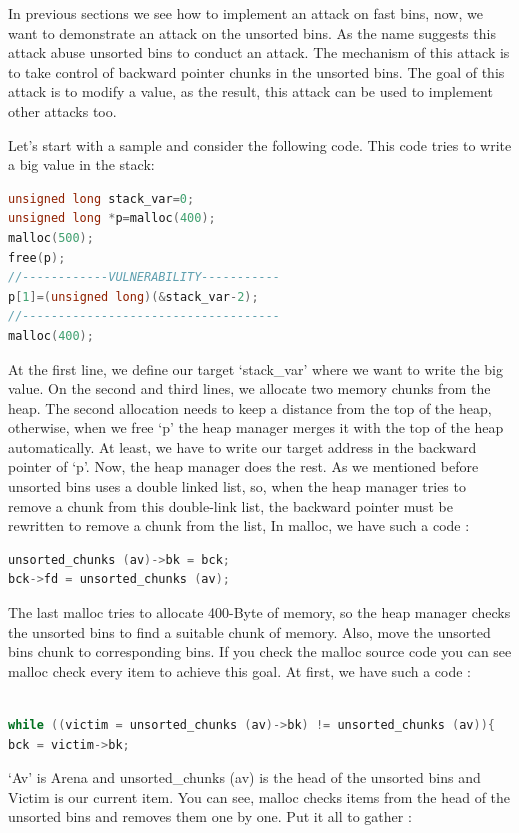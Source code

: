 \documentclass{masterthesis}
\newcommand*\fb{fast bins}
\newcommand*\ub{unsorted bins}
\begin{document}
In previous sections we see how to implement an attack on \fb{}, now, we want to demonstrate an attack on the \ub{}. As the name suggests this attack abuse \ub{} to conduct an attack. The mechanism of this attack is to take control of backward pointer chunks in the \ub{}. The goal of this attack is to modify a value, as the result, this attack can be used to implement other attacks too.

Let’s start with a sample and consider the following code. This code tries to write a big value in the stack:

\begin{lstlisting}[language=c,frame=tlrb]
unsigned long stack_var=0;
unsigned long *p=malloc(400);
malloc(500);
free(p);
//------------VULNERABILITY-----------
p[1]=(unsigned long)(&stack_var-2);
//------------------------------------
malloc(400);
\end{lstlisting}
 At the first line, we define our target ‘stack\_var’ where we want to write the big value. On the second and third lines, we allocate two memory chunks from the heap. The second allocation needs to keep a distance from the top of the heap, otherwise, when we free ‘p’ the heap manager merges it with the top of the heap automatically. At least, we have to write our target address in the backward pointer of ‘p’. Now, the heap manager does the rest. As we mentioned before \ub{} uses a double linked list, so, when the heap manager tries to remove a chunk from this double-link list, the backward pointer must be rewritten to remove a chunk from the list, In malloc, we have such a code : 
 
\begin{lstlisting}[language=c,frame=tlrb]
unsorted_chunks (av)->bk = bck;
bck->fd = unsorted_chunks (av);
\end{lstlisting}

The last malloc tries to allocate 400-Byte of memory, so the heap manager checks the \ub{} to find a suitable chunk of memory. Also, move the \ub{} chunk to corresponding bins. If you check the malloc source code you can see malloc check every item to achieve this goal. At first, we have such a code :
\begin{lstlisting}[language=c,frame=tlrb]

while ((victim = unsorted_chunks (av)->bk) != unsorted_chunks (av)){
bck = victim->bk;
\end{lstlisting}
‘Av’ is Arena and unsorted\_chunks (av) is the head of the \ub{} and Victim is our current item. You can see, malloc checks items from the head of the \ub{} and removes them one by one. Put it all to gather :
\end{document}
